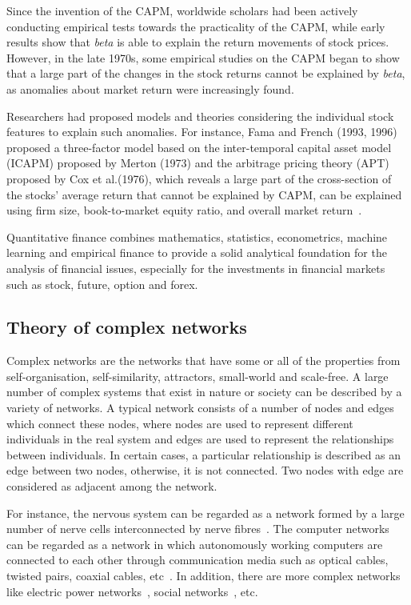 Since the invention of the CAPM, worldwide scholars had been actively conducting empirical tests towards the practicality of the CAPM, while early results show that \textit{beta} is able to explain the return movements of stock prices. However, in the late 1970s, some empirical studies on the CAPM began to show that a large part of the changes in the stock returns cannot be explained by \textit{beta}, as anomalies about market return were increasingly found.

Researchers had proposed models and theories considering the individual stock features to explain such anomalies. For instance, Fama and French (1993, 1996) proposed a three-factor model based on the inter-temporal capital asset model (ICAPM) \cite{intertemporal} proposed by Merton (1973) and the arbitrage pricing theory (APT)~\cite{options} proposed by Cox et al.(1976), which reveals a large part of the cross-section of the stocks’ average return that cannot be explained by CAPM, can be explained using firm size, book-to-market equity ratio, and overall market return~\cite{riskfactors, anomalies}.

Quantitative finance combines mathematics, statistics, econometrics, machine learning and empirical finance to provide a solid analytical foundation for the analysis of financial issues, especially for the investments in financial markets such as stock, future, option and forex.

\subsection{Theory of complex networks}
Complex networks are the networks that have some or all of the properties from self-organisation, self-similarity, attractors, small-world and scale-free. A large number of complex systems that exist in nature or society can be described by a variety of networks. A typical network consists of a number of nodes and edges which connect these nodes, where nodes are used to represent different individuals in the real system and edges are used to represent the relationships between individuals. In certain cases, a particular relationship is described as an edge between two nodes, otherwise, it is not connected. Two nodes with edge are considered as adjacent among the network.

For instance, the nervous system can be regarded as a network formed by a large number of nerve cells interconnected by nerve fibres~\cite{watts1998collective}. The computer networks can be regarded as a network in which autonomously working computers are connected to each other through communication media such as optical cables, twisted pairs, coaxial cables, etc~\cite{watts1998collective}. In addition, there are more complex networks like electric power networks~\cite{faloutsos1999power}, social networks~\cite{watts1998collective, hofman2017prediction, ebel2002scale}, etc.

